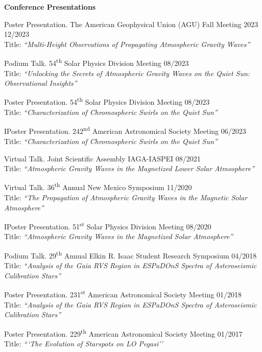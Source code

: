 \documentclass{resume} %
\begin{document}
\vspace{-0.1in}
\begin{rSection}{\textbf{Conference Presentations}}
\vspace{0.02in}

{Poster Presentation. The American Geophysical Union (AGU) Fall Meeting 2023 \hfill{12/2023} \\  Title: \emph{``Multi-Height Observations of Propagating Atmospheric Gravity Waves''}}

{Podium Talk. 54\textsuperscript{th} Solar Physics Division Meeting \hfill{08/2023} \\ Title: \emph{``Unlocking the Secrets of Atmospheric Gravity Waves on the Quiet Sun: Observational Insights''}}

{Poster Presentation. 54\textsuperscript{th} Solar Physics Division Meeting \hfill{08/2023} \\  Title: \emph{``Characterization of Chromospheric Swirls on the Quiet Sun''}}

{IPoster Presentation. 242\textsuperscript{nd} American Astronomical Society  Meeting \hfill{06/2023} \\ Title: \emph{``Characterization of Chromospheric Swirls on the Quiet Sun''}}

{Virtual Talk. Joint Scientific Assembly IAGA-IASPEI \hfill{08/2021} \\ Title: \emph{``Atmospheric Gravity Waves in the Magnetized Lower Solar Atmosphere''}} 

{Virtual Talk. 36\textsuperscript{th} Annual New Mexico Symposium \hfill{11/2020} \\ Title: \emph{``The Propagation of Atmospheric Gravity Waves in the Magnetic Solar Atmosphere''}}

{IPoster Presentation. 51\textsuperscript{st} Solar Physics Division Meeting \hfill{08/2020} \\ Title: \emph{``Atmospheric Gravity Waves in the Magnetized Solar Atmosphere''}}


{Podium Talk. 29\textsuperscript{th} Annual Elkin R. Isaac Student Research Symposium \hfill{04/2018} \\ Title: \emph{``Analysis of the Gaia RVS Region in ESPaDOnS Spectra of Asteroseismic Calibration Stars''}}

{Poster Presentation. 231\textsuperscript{st} American Astronomical Society Meeting \hfill{01/2018} \\ Title: \emph{``Analysis of the Gaia RVS Region in ESPaDOnS Spectra of Asteroseismic Calibration
Stars''}} 

{Poster Presentation. 229\textsuperscript{th} American Astronomical Society Meeting \hfill{01/2017} \\ Title: \emph{```The Evolution of Starspots on LO Pegasi''}}
\end{rSection}
\end{document}
